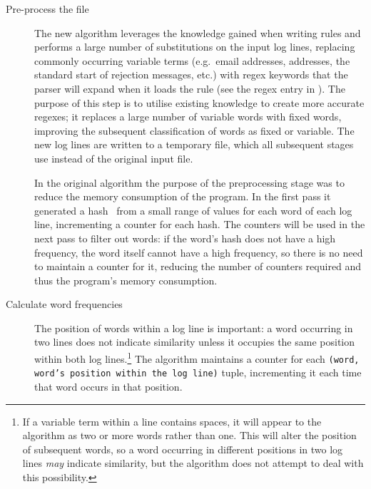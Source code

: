 \begin{description}

    \item [Pre-process the file]  The new algorithm leverages the knowledge
        gained when writing rules and performs a large number of
        substitutions on the input log lines, replacing commonly occurring
        variable terms (e.g.\ email addresses, \IP{} addresses, the
        standard start of rejection messages, etc.) with regex keywords
        that the parser will expand when it loads the rule (see the
        regex entry in ).  The purpose of
        this step is to utilise existing knowledge to create more accurate
        regexes; it replaces a large number of variable words with fixed
        words, improving the subsequent classification of words as fixed or
        variable.  The new log lines are written to a temporary file, which
        all subsequent stages use instead of the original input file.

        In the original algorithm the purpose of the preprocessing stage
        was to reduce the memory consumption of the program.  In the first
        pass it generated a hash~\cite{hash-functions} from a small range of values for each word
        of each log line, incrementing a counter for each hash.  The
        counters will be used in the next pass to filter out words: if the
        word's hash does not have a high frequency, the word itself cannot
        have a high frequency, so there is no need to maintain a counter
        for it, reducing the number of counters required and thus the
        program's memory consumption.

    \item [Calculate word frequencies]  The position of words within a log
        line is important: a word occurring in two lines does not indicate
        similarity unless it occupies the same position within both log
        lines.\footnote{If a variable term within a line contains spaces,
        it will appear to the algorithm as two or more words rather than
        one.  This will alter the position of subsequent words, so a word
        occurring in different positions in two log lines \textit{may\/}
        indicate similarity, but the algorithm does not attempt to deal
        with this possibility.}  The algorithm maintains a counter for each
        \texttt{(word, word's position within the log line)} tuple,
        incrementing it each time that word occurs in that position.


\end{description}
